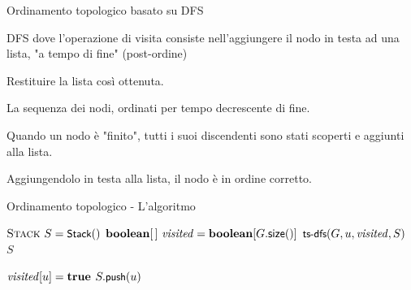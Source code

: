 \begin{frame}{Ordinamento topologico basato su DFS}

\vspace{-9pt}
\begin{myboxtitle}[Algoritmo]
\BI
\item DFS dove l'operazione di visita consiste nell'aggiungere il nodo in testa ad una lista, \alert{"a tempo di fine"} (post-ordine)
\item Restituire la lista così ottenuta.
\EI
\end{myboxtitle}

\begin{myboxtitle}[Output]
\BI
\item La sequenza dei nodi, ordinati per tempo decrescente di fine.
\EI
\end{myboxtitle}

\begin{myboxtitle}
\pause
\BI
\item Quando un nodo è "finito", tutti i suoi discendenti sono stati scoperti e aggiunti alla lista. 
\item Aggiungendolo in testa alla lista, il nodo è in ordine corretto.
\EI
\end{myboxtitle}

\end{frame}

\begin{frame}[shrink=10]{Ordinamento topologico - L'algoritmo}

\vspace{-12pt}
\begin{Procedure}
\caption[A]{\Stack\ \topsort(\Graph $G$)}
$\textsc{Stack}\ S = \textsf{{\small Stack}}()$\;
$\BOOLEAN[\,]\ \mmark = \BOOLEAN[G.\textsf{size}()]$\;
{
  \If{\NOT\ $\mmark[u]$}
  {
    $\textsf{{\small ts-dfs}}(G, u, \mathit{visited}, S)$\;
  }
}
\Return $S$\;
\end{Procedure}

\vspace{-16pt}
\begin{Procedure}
\caption[A]{\topsortdfs(\Graph $G$, \Node\ $u$, $\BOOLEAN[\,]\ \mmark$, \Stack $S$)}
$\mmark[u] = \TRUE$\;
{
}
$S.\textsf{{\small push}}(u)$\;
\end{Procedure}

\end{frame}

